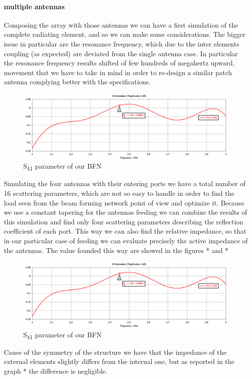 \paragraph{multiple antennas} Composing the array with those antennas we can have a first simulation of the complete radiating element, and so we can make some considerations. The bigger issue in particular are the resonance frequency, which due to the inter elements coupling (as expected) are deviated from the single antenna case. In particular the resonance frequency results shifted of few hundreds of megahertz upward, movement that we have to take in mind in order to re-design a similar patch antenna complying better with the specifications.
\begin{figure}[H]
	\centering
	\includegraphics[scale=0.35]{S41Amp.png}
	\caption{S\textsubscript{41} parameter of our BFN}
	\label{S41Amp}
\end{figure}
Simulating the four antennas with their entering ports we have a total number of 16 scattering parameters, which are not so easy to handle in order to find the load seen from the beam forming network point of view and optimize it. Because we use a constant tapering for the antennas feeding we can combine the results of this simulation and find only four scattering parameters describing the reflection coefficient of each port. This way we can also find the relative impedance, so that in our particular case of feeding we can evaluate precisely the active impedance of the antennas. The value founded this way are showed in the figures * and *
\begin{figure}[H]
	\centering
	\includegraphics[scale=0.35]{S41Amp.png}
	\caption{S\textsubscript{41} parameter of our BFN}
	\label{S41Amp}
\end{figure}
Cause of the symmetry of the structure we have that the impedance of the external elements slightly differs from the internal one, but as reported in the graph * the difference is negligible.


